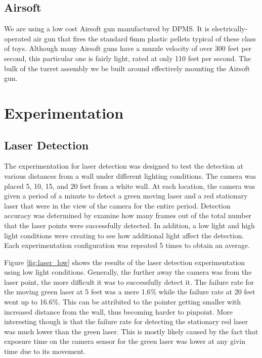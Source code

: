 \documentclass[10pt,twocolumn,letterpaper]{article}
\begin{document}
\subsection{Airsoft}

We are using a low cost Airsoft gun manufactured by DPMS. It is electrically-operated air gun that fires the standard 6mm plastic pellets typical of these class of toys. Although many Airsoft guns have a muzzle velocity of over 300 feet per second, this particular one is fairly light, rated at only 110 feet per second. The bulk of the turret assembly we be built around effectively mounting the Airsoft gun.

\section{Experimentation}

\subsection{Laser Detection}

The experimentation for laser detection was designed to test the detection at various distances from a wall under different lighting conditions. The camera was placed 5, 10, 15, and 20 feet from a white wall. At each location, the camera was given a period of a minute to detect a green moving laser and a red stationary laser that were in the view of the camera for the entire period. Detection accuracy was determined by examine how many frames out of the total number that the laser points were successfully detected. In addition, a low light and high light conditions were creating to see how additional light affect the detection. Each experimentation configuration was repeated 5 times to obtain an average.

Figure \ref{fig:laser_low} shows the results of the laser detection experimentation using low light conditions. Generally, the further away the camera was from the laser point, the more difficult it was to successfully detect it. The failure rate for the moving green laser at 5 feet was a mere 1.6\% while the failure rate at 20 feet went up to 16.6\%. This can be attribited to the pointer getting smaller with increased distance from the wall, thus becoming harder to pinpoint. More interesting though is that the failure rate for detecting the stationary red laser was much lower than the green laser. This is mostly likely caused by the fact that exposure time on the camera sensor for the green laser was lower at any givin time due to its movement.  
\end{document}

